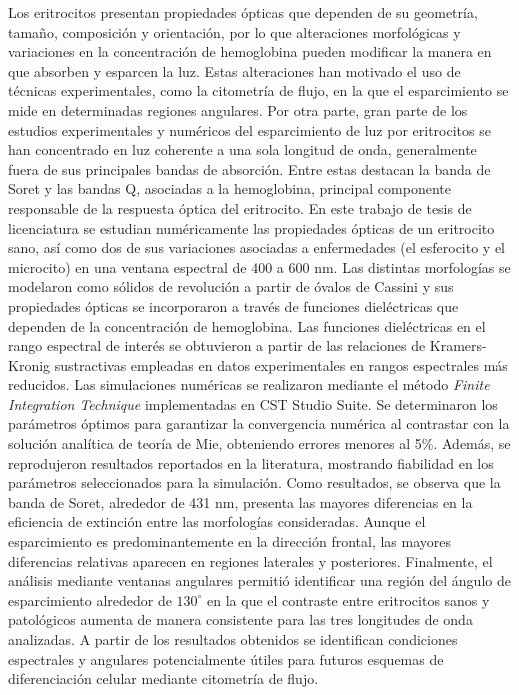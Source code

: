 

\begin{abstracts}        %
 

Los eritrocitos presentan propiedades ópticas que dependen de su geometría, tamaño, composición y orientación, por lo que alteraciones morfológicas y variaciones en la concentración de hemoglobina pueden modificar la manera en que absorben y esparcen la luz. Estas alteraciones han motivado el uso de técnicas experimentales, como la citometría de flujo, en la que el esparcimiento se mide en determinadas regiones angulares. Por otra parte, gran parte de los estudios experimentales y numéricos del esparcimiento de luz por eritrocitos se han concentrado en luz coherente a una sola longitud de onda, generalmente fuera de sus principales bandas de absorción. Entre estas destacan la banda de Soret y las bandas Q, asociadas a la hemoglobina, principal componente responsable de la respuesta óptica del eritrocito. En este trabajo de tesis de licenciatura se estudian numéricamente las propiedades ópticas de un eritrocito sano, así como dos de sus variaciones asociadas a enfermedades (el esferocito y el microcito) en una ventana espectral de 400 a 600 nm. Las distintas  morfologías se modelaron como sólidos de revolución a partir de óvalos de Cassini y sus propiedades ópticas se incorporaron a través de funciones dieléctricas que dependen de la concentración de hemoglobina. Las funciones dieléctricas en el rango espectral de interés se obtuvieron a partir de las relaciones de Kramers-Kronig sustractivas empleadas en datos experimentales en rangos espectrales más reducidos. Las simulaciones numéricas se realizaron mediante el método \textit{Finite Integration Technique} implementadas en CST Studio Suite. Se determinaron los parámetros óptimos para garantizar la convergencia numérica al contrastar con la solución analítica de teoría de Mie, obteniendo errores menores al 5\%. Además, se reprodujeron resultados reportados en la literatura, mostrando fiabilidad en los parámetros seleccionados para la simulación. Como resultados, se observa que la banda de Soret, alrededor de 431 nm,  presenta las mayores diferencias en la eficiencia de extinción entre las morfologías consideradas. Aunque el esparcimiento es predominantemente en la dirección frontal, las mayores diferencias relativas aparecen en regiones laterales y posteriores.  Finalmente, el análisis mediante ventanas angulares permitió identificar una región del ángulo de esparcimiento alrededor de $130^\circ$ en la que el contraste entre eritrocitos sanos y patológicos aumenta de manera consistente para las tres longitudes de onda analizadas. A partir de los resultados obtenidos se identifican condiciones espectrales y angulares potencialmente útiles para futuros esquemas de diferenciación celular mediante citometría de flujo.


  

\end{abstracts}


